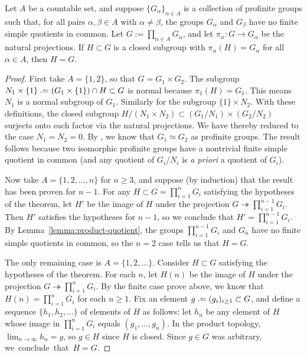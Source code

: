 	\begin{lemma} \label{theorem:goursat}
		Let $A$ be a countable set, and suppose $\{G_\alpha\}_{\alpha \in A}$ is a collection of profinite groups such that, for all pairs $\alpha, \beta \in A$ with $\alpha \neq \beta$, the groups $G_\alpha$ and $G_\beta$ have no finite simple quotients in common. Let $G := \prod_{\alpha \in A} G_\alpha$, and let $\pi_\alpha : G \to G_\alpha$ be the natural projections. If $H \subset G$ is a closed subgroup with $\pi_\alpha(H) = G_\alpha$ for all $\alpha \in A$, then $H = G$.
	\end{lemma}
	\begin{proof}
		First take $A = \{1, 2\}$, so that $G = G_1 \times G_2$. The subgroup
		\(
			N_1 \times \{1\} \defeq (G_1 \times \{1\}) \cap H \subset G
		\)
		is normal because $\pi_1(H) = G_1$. This means $N_1$ is a normal subgroup of $G_1$. Similarly for the subgroup $\{1\} \times N_2$. With these definitions, the closed subgroup
		\(
			H / (N_1 \times N_2) \subset (G_1 / N_1) \times (G_2 / N_2)
		\)
		surjects onto each factor via the natural projections. We have thereby reduced to the case $N_1 = N_2 = 0$. By \cite[Lemma 5.2.1]{ribbit}, we know that $G_1 \simeq G_2$ as profinite groups. The result follows because two isomorphic profinite groups have a nontrivial finite simple quotient in common (and any quotient of $G_i / N_i$ is \emph{a priori} a quotient of $G_i$).
		
		Now take $A = \{1, 2, \ldots, n\}$ for $n \ge 3$, and suppose (by induction) that the result has been proven for $n-1$. For any $H \subset G = \prod_{i=1}^n G_i$ satisfying the hypotheses of the theorem, let $H'$ be the image of $H$ under the projection $G \twoheadrightarrow \prod_{i=1}^{n-1} G_i$. Then $H'$ satisfies the hypotheses for $n-1$, so we conclude that $H' = \prod_{i=1}^{n-1} G_i$. By Lemma~\ref{lemma:product-quotient}, the groups $\prod_{i=1}^{n-1} G_i$ and $G_n$ have no finite simple quotients in common, so the $n = 2$ case tells us that $H = G$.
		
		The only remaining case is $A = \{1, 2, \ldots\}$. Consider $H \subset G$ satisfying the hypotheses of the theorem. For each $n$, let $H(n)$ be the image of $H$ under the projection $G \twoheadrightarrow \prod_{i=1}^{n} G_i$. By the finite case prove above, we know that $H(n) = \prod_{i=1}^n G_i$ for each $n \ge 1$. Fix an element $g \defeq (g_i)_{i \ge 1} \subset G$, and define a sequence $\{h_1, h_2, \ldots\}$ of elements of $H$ as follows: let $h_n$ be any element of $H$ whose image in $\prod_{i=1}^n G_i$ equals $(g_1, \ldots, g_n)$. In the product topology, $\lim_{n \rightarrow \infty} h_n = g$, so $g \in H$ since $H$ is closed. Since $g \in G$ was arbitrary, \mbox{we conclude that $H = G$.}
	\end{proof}

